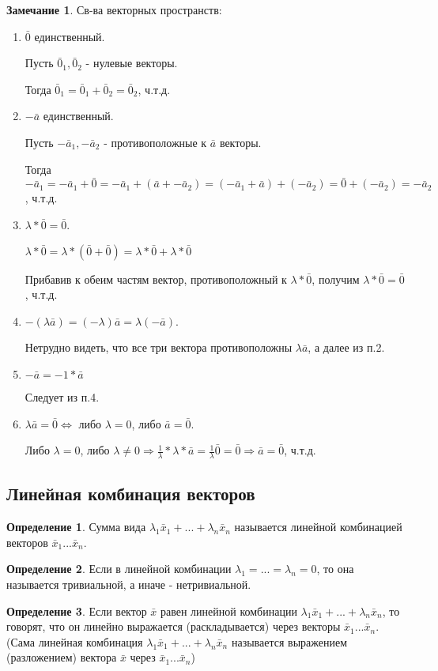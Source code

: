 \documentclass[a4paper, 12pt]{article}
\theoremstyle{definition}
\newtheorem*{definition}{Определение}
\newtheorem*{remark}{Замечание}
\begin{document}
	\begin{remark}
		Св-ва векторных пространств:
		
		\begin{enumerate}
			
			\item $\bar{0}$ единственный.
			
			Пусть $\bar{0}_{1}, \bar{0}_{2}$ - нулевые векторы.
			
			Тогда $\bar{0}_{1} = \bar{0}_{1} + \bar{0}_{2} = \bar{0}_{2}$, ч.т.д.
			\item $-\bar{a}$ единственный.
			
			Пусть $-\bar{a}_{1}, -\bar{a}_{2}$ - противоположные к $\bar{a}$ векторы.
			
			Тогда $-\bar{a}_{1} = -\bar{a}_{1} + \bar{0} = -\bar{a}_{1} + (\bar{a} + -\bar{a}_{2}) = (-\bar{a}_{1} + \bar{a}) + (-\bar{a}_{2}) = \bar{0} + (-\bar{a}_{2}) = -\bar{a}_{2}$, ч.т.д.
			\item $\lambda * \bar{0} = \bar{0}$.
			
			$\lambda * \bar{0} = \lambda * (\bar{0} + \bar{0}) = \lambda * \bar{0} + \lambda * \bar{0}$
			
			Прибавив к обеим частям вектор, противоположный к $\lambda * \bar{0}$, получим $\lambda * \bar{0} = \bar{0}$, ч.т.д.
			\item $-(\lambda\bar{a}) = (-\lambda)\bar{a} = \lambda(-\bar{a})$.
			
			Нетрудно видеть, что все три вектора противоположны $\lambda\bar{a}$, а далее из п.2.
			\item $-\bar{a} = -1*\bar{a}$
			
			Следует из п.4.
			\item $\lambda\bar{a} = \bar{0} \Leftrightarrow$ либо $\lambda = 0$, либо $\bar{a} = \bar{0}$.
			
			Либо $\lambda = 0$, либо $\lambda \neq 0 \Rightarrow \frac{1}{\lambda}*\lambda*\bar{a} = \frac{1}{\lambda}\bar{0} = \bar{0} \Rightarrow \bar{a} = \bar{0}$, ч.т.д. 
		\end{enumerate}
	\end{remark}
	\subsection{Линейная комбинация векторов}
	\begin{definition}
		Сумма вида $\lambda_{1}\bar{x}_{1} + ... + \lambda_{n}\bar{x}_{n}$ называется линейной комбинацией векторов $\bar{x}_{1} ... \bar{x}_{n}$.
	\end{definition}
	\begin{definition}
		Если в линейной комбинации $\lambda_{1} = ... = \lambda_{n} = 0$, то она называется тривиальной, а иначе - нетривиальной.
	\end{definition}
	\begin{definition}
		Если вектор $\bar{x}$ равен линейной комбинации $\lambda_{1}\bar{x}_{1} + ... + \lambda_{n}\bar{x}_{n}$, то говорят, что он линейно выражается (раскладывается) через векторы $\bar{x}_{1}...\bar{x}_{n}$.
		(Сама линейная комбинация $\lambda_{1}\bar{x}_{1} + ... + \lambda_{n}\bar{x}_{n}$ называется выражением (разложением) вектора $\bar{x}$ через $\bar{x}_{1}...\bar{x}_{n}$)  
	\end{definition}
\end{document}
